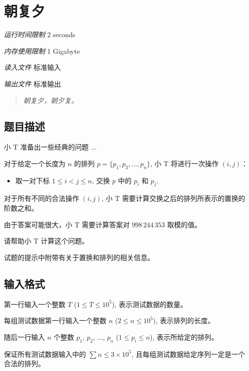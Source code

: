 \section[H. 朝复夕]{ 朝复夕}

\textit{运行时间限制}   2 seconds

\textit{内存使用限制} 1 Gigabyte

\textit{读入文件} \qquad 标准输入

\textit{输出文件} \qquad 标准输出


\begin{quote}
   \textit{朝复夕，朝夕复。}
\end{quote}


\subsection{题目描述}

小 T 准备出一些经典的问题 $\ldots$

对于给定一个长度为 $n$ 的排列 $p = \{p_1, p_2, \ldots, p_n\}$, 小 T 将进行一次操作 $(i, j)$：

\begin{itemize}
   \item 取一对下标 $1 \le i < j \le n$, 交换 $p$ 中的 $p_i$ 和 $p_j$.
\end{itemize}

对于所有不同的合法操作 $(i, j)$, 小 T 需要计算交换之后的排列所表示的置换的阶数之和。

由于答案可能很大，小 T 需要计算答案对 $998\,244\,353$ 取模的值。

请帮助小 T 计算这个问题。

试题的提示中附带有关于置换和排列的相关信息。

\subsection{输入格式}

第一行输入一个整数 $T$ ($1 \le T \le 10^5$), 表示测试数据的数量。

每组测试数据第一行输入一个整数 $n$ ($2 \le n \le 10^5$), 表示排列的长度。

随后一行输入 $n$ 个整数 $p_1$, $p_2$, $\ldots$, $p_n$ ($1 \le p_i \le n$), 表示所给定的排列。

保证所有测试数据输入中的 $\sum n \le 3 \times 10^5$, 且每组测试数据给定序列一定是一个合法的排列。

